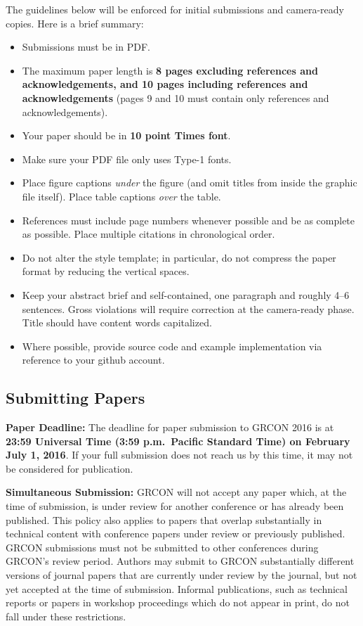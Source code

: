 \documentclass{article}
\begin{document}
The guidelines below will be enforced for initial submissions and
camera-ready copies.  Here is a brief summary:
\begin{itemize}
\item Submissions must be in PDF.
\item The maximum paper length is \textbf{8 pages excluding references and acknowledgements, and 10 pages
  including references and acknowledgements} (pages 9 and 10 must contain only references and acknowledgements).

\item Your paper should be in \textbf{10 point Times font}.
\item Make sure your PDF file only uses Type-1 fonts.
\item Place figure captions {\em under} the figure (and omit titles from inside
the graphic file itself).  Place table captions {\em over} the table.
\item References must include page numbers whenever possible and be as complete
as possible.  Place multiple citations in chronological order.  
\item Do not alter the style template; in particular, do not compress the paper
format by reducing the vertical spaces.
\item Keep your abstract brief and self-contained, one
   paragraph and roughly 4--6 sentences.  Gross violations will require correction at the camera-ready phase.
  Title should have content words capitalized.
\item Where possible, provide source code and example implementation via reference to your github account.
  

\end{itemize}

\subsection{Submitting Papers}

{\bf Paper Deadline:} The deadline for paper submission to GRCON 2016
is at \textbf{23:59 Universal Time (3:59 p.m.\ Pacific Standard Time) on February July 1, 2016}.
If your full submission does not reach us by this time, it may not be 
considered for publication.

{\bf Simultaneous Submission:} GRCON will not accept any paper which,
at the time of submission, is under review for another conference or
has already been published. This policy also applies to papers that
overlap substantially in technical content with conference papers
under review or previously published. GRCON submissions must not be
submitted to other conferences during GRCON's review period. Authors
may submit to GRCON substantially different versions of journal papers
that are currently under review by the journal, but not yet accepted
at the time of submission. Informal publications, such as technical
reports or papers in workshop proceedings which do not appear in
print, do not fall under these restrictions.
\end{document}
